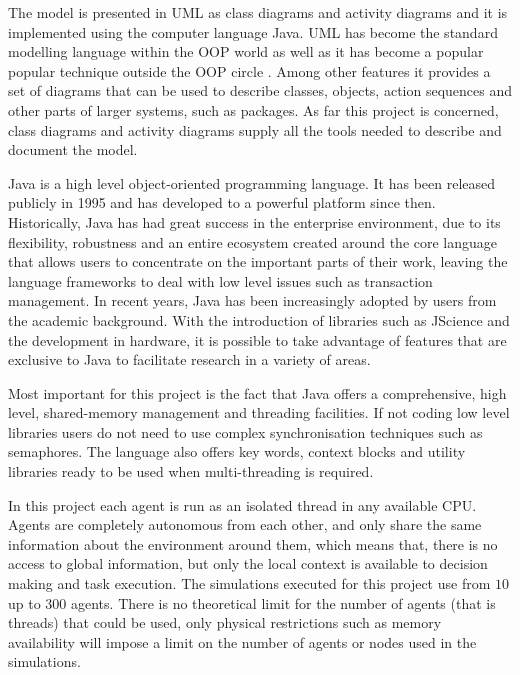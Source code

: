 The model is presented in \ac{UML} as class diagrams and activity diagrams and it is implemented using the computer language Java. \ac{UML} has become the standard modelling language within the \ac{OOP} world as well as it has become a popular popular technique outside the \ac{OOP} circle \cite{fowler2004uml}. Among other features it provides a set of diagrams that can be used to describe classes, objects, action sequences and other parts of larger systems, such as packages. As far this project is concerned, class diagrams and activity diagrams supply all the tools needed to describe and document the model.

Java is a high level object-oriented programming language. It has been released publicly in 1995 and has developed to a powerful platform since then. Historically, Java has had great success in the enterprise environment, due to its flexibility, robustness and an entire ecosystem created around the core language that allows users to concentrate on the important parts of their work, leaving the language frameworks to deal with low level issues such as transaction management. In recent years, Java has been increasingly adopted by users from the academic background. With the introduction of libraries such as JScience and the development in hardware, it is possible to take advantage of features that are exclusive to Java to facilitate research in a variety of areas.

Most important for this project is the fact that Java offers a comprehensive, high level, shared-memory management and threading facilities. If not coding low level libraries users do not need to use complex synchronisation techniques such as semaphores. The language also offers key words, context blocks and utility libraries ready to be used when multi-threading is required.

In this project each agent is run as an isolated thread in any available CPU. Agents are completely autonomous from each other, and only share the same information about the environment around them, which means that, there is no access to global information, but only the local context is available to  decision making and task execution. The simulations executed for this project use from $10$ up to $300$ agents. There is no theoretical limit for the number of agents (that is threads) that could be used, only physical restrictions such as memory availability will impose a limit on the number of agents or nodes used in the simulations.